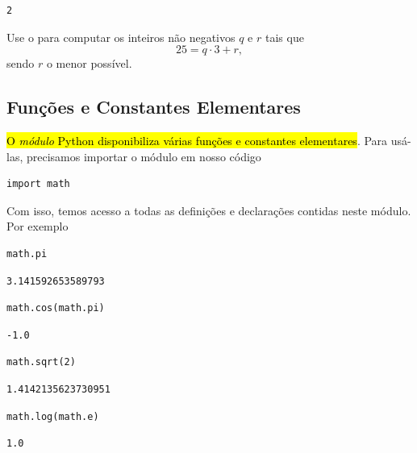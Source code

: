 \documentclass[12pt]{article}
\begin{document}
\begin{verbatim}
2
\end{verbatim}

\begin{exr}
  Use o {\python} para computar os inteiros não negativos $q$ e $r$ tais que
  \begin{equation}
    25 = q\cdot 3 + r,
  \end{equation}
  sendo $r$ o menor possível.
\end{exr}

\subsection{Funções e Constantes Elementares}

\hl{O \emph{módulo} Python {\PYTHONmath} disponibiliza várias funções e constantes elementares}. Para usá-las, precisamos importar o módulo em nosso código

\begin{lstlisting}
import math
\end{lstlisting}

Com isso, temos acesso a todas as definições e declarações contidas neste módulo. Por exemplo

\begin{lstlisting}
math.pi
\end{lstlisting}

\begin{verbatim}
3.141592653589793
\end{verbatim}

\begin{lstlisting}
math.cos(math.pi)
\end{lstlisting}

\begin{verbatim}
-1.0
\end{verbatim}

\begin{lstlisting}
math.sqrt(2)
\end{lstlisting}

\begin{verbatim}
1.4142135623730951
\end{verbatim}

\begin{lstlisting}
math.log(math.e)
\end{lstlisting}

\begin{verbatim}
1.0
\end{verbatim}
\end{document}
